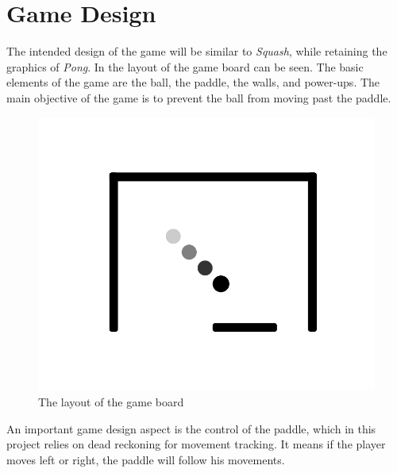 \section{Game Design}\label{section:game-design}
The intended design of the game will be similar to \textit{Squash}, while retaining the graphics of \textit{Pong}. 
In  the layout of the game board can be seen. 
The basic elements of the game are the ball, the paddle, the walls, and power-ups. 
The main objective of the game is to prevent the ball from moving past the paddle.

\begin{figure}[h]
	\centering
	\includegraphics[scale = 0.3]{media/design/game-layout.pdf}
	\caption{The layout of the game board}
	\label{figure:game-layout}
\end{figure}

An important game design aspect is the control of the paddle, which in this project relies on dead reckoning for movement tracking. 
It means if the player moves left or right, the paddle will follow his movements. 

